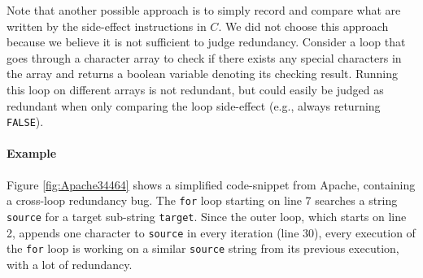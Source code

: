 Note that another possible approach is to simply record and compare what
are written by the side-effect instructions in $C$.
We did not choose this approach because we believe it is not sufficient
to judge redundancy. Consider a loop that goes through a character array 
to check if there exists any special characters in the array
and returns a boolean
variable denoting its checking result. Running this loop on 
different arrays is not redundant, but could easily be judged as redundant
when only comparing the loop side-effect (e.g., always returning 
\texttt{FALSE}).




\paragraph{Example}
Figure \ref{fig:Apache34464} shows a simplified code-snippet from Apache,
containing a cross-loop redundancy bug. 
The \texttt{for} loop starting on line 7 
searches a string \texttt{source} for a target sub-string 
\texttt{target}. Since the outer loop, which starts on line 2, appends one 
character to \texttt{source} in every iteration (line 30), 
every execution of the \texttt{for} loop is working on a similar 
\texttt{source} string from its previous execution, with a lot of redundancy. 

